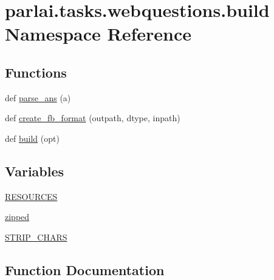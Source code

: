 \hypertarget{namespaceparlai_1_1tasks_1_1webquestions_1_1build}{}\section{parlai.\+tasks.\+webquestions.\+build Namespace Reference}
\label{namespaceparlai_1_1tasks_1_1webquestions_1_1build}
\subsection*{Functions}
\begin{DoxyCompactItemize}
\item 
def \hyperlink{namespaceparlai_1_1tasks_1_1webquestions_1_1build_a969c68eeef096e477def172c88928eb3}{parse\+\_\+ans} (a)
\item 
def \hyperlink{namespaceparlai_1_1tasks_1_1webquestions_1_1build_aba751402cc3a79acbe7517832498a7e6}{create\+\_\+fb\+\_\+format} (outpath, dtype, inpath)
\item 
def \hyperlink{namespaceparlai_1_1tasks_1_1webquestions_1_1build_a175826dcfcbe18189c4c668b1b335239}{build} (opt)
\end{DoxyCompactItemize}
\subsection*{Variables}
\begin{DoxyCompactItemize}
\item 
\hyperlink{namespaceparlai_1_1tasks_1_1webquestions_1_1build_ac4b3a91c9fccce1e8d32040a57332c07}{R\+E\+S\+O\+U\+R\+C\+ES}
\item 
\hyperlink{namespaceparlai_1_1tasks_1_1webquestions_1_1build_a70beb73bd71c22e115647782b0a1a415}{zipped}
\item 
\hyperlink{namespaceparlai_1_1tasks_1_1webquestions_1_1build_a9f4c36987a516850b209c40be8b822ae}{S\+T\+R\+I\+P\+\_\+\+C\+H\+A\+RS}
\end{DoxyCompactItemize}


\subsection{Function Documentation}
\mbox{\label{namespaceparlai_1_1tasks_1_1webquestions_1_1build_a175826dcfcbe18189c4c668b1b335239}} 
